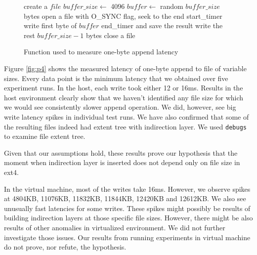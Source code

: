 \begin{figure}
\begin{algorithmic}
\STATE create a $file$
\STATE $buffer\_size \leftarrow$ 4096
\STATE $buffer \leftarrow$ random $buffer\_size$ bytes
\STATE open a file with O\_SYNC flag, seek to the end
\STATE start\_timer
\STATE write first byte of $buffer$
\STATE end\_timer and save the result
\STATE write the rest $buffer\_size - 1$ bytes
\STATE close a file
\ENDFOR
\end{algorithmic}
\caption{Function used to measure one-byte append latency}
\label{fig:p4pseudo}
\end{figure}

Figure \ref{fig:p4} shows the measured latency of one-byte append to file of variable sizes. Every data point is the minimum latency that we obtained over five experiment runs. In the host, each write took either 12 or 16ms. Results in the host environment clearly show that we haven't identified any file size for which we would see consistently slower append operation. We did, however, see big write latency spikes in individual test runs. We have also confirmed that some of the resulting files indeed had extent tree with indirection layer. We used \texttt{debugs} to examine file extent tree.

Given that our assumptions hold, these results prove our hypothesis that the moment when indirection layer is inserted does not depend only on file size in ext4.

In the virtual machine, most of the writes take 16ms. However, we observe spikes at 4804KB, 11076KB, 11832KB, 11844KB, 12420KB and 12612KB. We also see unusually fast latencies for some writes. These spikes might possibly be results of building indirection layers at those specific file sizes. However, there might be also results of other anomalies in virtualized environment. We did not further investigate those issues. Our results from running experiments in virtual machine do not prove, nor refute, the hypothesis.

